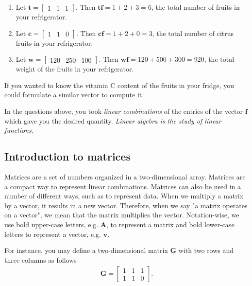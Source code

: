 \begin{sol}
\begin{enumerate}
    \item Let $\mathbf{t} = \begin{bmatrix}
        1 & 1 & 1
    \end{bmatrix}$. Then $\mathbf{t}\mathbf{f} = 1 + 2 + 3 = 6$, the total number of fruits in your refrigerator.
    \item Let $\mathbf{c} = \begin{bmatrix}
        1 & 1 & 0
    \end{bmatrix}$. Then $\mathbf{c}\mathbf{f} = 1 + 2 + 0 = 3$, the total number of citrus fruits in your refrigerator.
    \item Let $\mathbf{w} = \begin{bmatrix}
        120 & 250 & 100
    \end{bmatrix}$. Then $\mathbf{w}\mathbf{f} = 120 + 500 + 300 = 920$, the total weight of the fruits in your refrigerator.
\end{enumerate}
\end{sol}

If you wanted to know the vitamin C content of the fruits in your fridge, you could formulate a similar vector to compute it.

In the questions above, you took \emph{linear combinations} of the entries of the vector $\mathbf{f}$ which gave you the desired quantity. \emph{Linear algebra is the study of linear functions.}

\subsection{Introduction to matrices}

Matrices  are a set of numbers organized in a two-dimensional array. Matrices are a compact way to represent linear combinations. Matrices can also be used in a number of different ways, such as to represent data.  When we multiply a matrix by a vector, it results in a new vector. Therefore, when we say "a matrix operates on a vector", we mean that the matrix multiplies the vector. Notation-wise, we use bold upper-case letters, e.g. $\mathbf{A}$, to represent a matrix and bold lower-case letters to represent a vector, e.g. $\mathbf{v}$.

For instance, you may define a two-dimensional matrix $\mathbf{G}$ with two rows and three columns as follows
\begin{align}
\label{eq:matrixG}
\mathbf{G} =
\begin{bmatrix}
1 & 1 & 1 \\
1 & 1 & 0
\end{bmatrix}.
\end{align}


